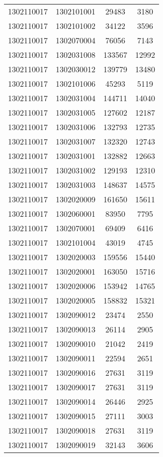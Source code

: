 \begin{longtable}[h]{llcc}
		1302110017 & 1302101001 & 29483 & 3180\\
		1302110017 & 1302101002 & 34122 & 3596\\
		1302110017 & 1302070004 & 76056 & 7143\\
		1302110017 & 1302031008 & 133567 & 12992\\
		1302110017 & 1302030012 & 139779 & 13480\\
		1302110017 & 1302101006 & 45293 & 5119\\
		1302110017 & 1302031004 & 144711 & 14040\\
		1302110017 & 1302031005 & 127602 & 12187\\
		1302110017 & 1302031006 & 132793 & 12735\\
		1302110017 & 1302031007 & 132320 & 12743\\
		1302110017 & 1302031001 & 132882 & 12663\\
		1302110017 & 1302031002 & 129193 & 12310\\
		1302110017 & 1302031003 & 148637 & 14575\\
		1302110017 & 1302020009 & 161650 & 15611\\
		1302110017 & 1302060001 & 83950 & 7795\\
		1302110017 & 1302070001 & 69409 & 6416\\
		1302110017 & 1302101004 & 43019 & 4745\\
		1302110017 & 1302020003 & 159556 & 15440\\
		1302110017 & 1302020001 & 163050 & 15716\\
		1302110017 & 1302020006 & 153942 & 14765\\
		1302110017 & 1302020005 & 158832 & 15321\\
		1302110017 & 1302090012 & 23474 & 2550\\
		1302110017 & 1302090013 & 26114 & 2905\\
		1302110017 & 1302090010 & 21042 & 2419\\
		1302110017 & 1302090011 & 22594 & 2651\\
		1302110017 & 1302090016 & 27631 & 3119\\
		1302110017 & 1302090017 & 27631 & 3119\\
		1302110017 & 1302090014 & 26446 & 2925\\
		1302110017 & 1302090015 & 27111 & 3003\\
		1302110017 & 1302090018 & 27631 & 3119\\
		1302110017 & 1302090019 & 32143 & 3606\\

\end{longtable}
